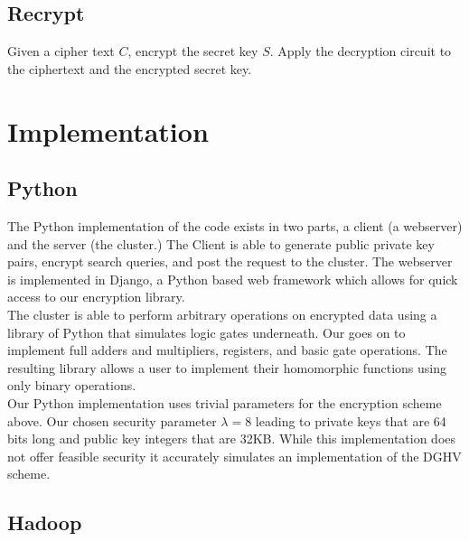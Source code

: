 \documentclass[letterpaper,11pt]{article} %
\begin{document}
\subsection*{Recrypt}
Given a cipher text $C$, encrypt the secret key $S$. Apply the decryption circuit to the ciphertext and the encrypted secret key.
\\
\section*{Implementation}
\subsection*{Python}
The Python implementation of the code exists in two parts, a client (a webserver) and the server (the cluster.) The Client is able to generate public private key pairs, encrypt search queries, and post the request to the cluster. The webserver is implemented in Django, a Python based web framework which allows for quick access to our encryption library.  \\

The cluster is able to perform arbitrary operations on encrypted data using a library of Python that simulates logic gates underneath. Our goes on to implement full adders and multipliers, registers, and basic gate operations. The resulting library allows a user to implement their homomorphic functions using only binary operations.\\

Our Python implementation uses trivial parameters for the encryption scheme above. Our chosen security parameter $\lambda=8$ leading to private keys that are 64 bits long and public key integers that are 32KB. While this implementation does not offer feasible security it accurately simulates an implementation of the DGHV scheme.


\subsection*{Hadoop}

\end{document}
